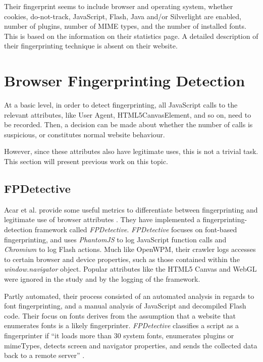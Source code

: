 \documentclass[
    fontsize=12pt,
    headings=small,
    parskip=half,
    bibliography=totoc,
    numbers=noenddot,
    open=any
    ]{scrreprt}
\begin{document}
Their fingerprint seems to include browser and operating system, whether cookies, do-not-track,
JavaScript, Flash, Java and/or Silverlight are enabled, number of plugins, number of MIME types,
and the number of installed fonts. This is based on the information on their statistics page.
A detailed description of their fingerprinting technique is absent on their website.

\section{Browser Fingerprinting Detection}
At a basic level, in order to detect fingerprinting, all JavaScript calls to the relevant attributes,
like User Agent, HTML5CanvasElement, and so on, need to be recorded. Then, a decision can be made about whether the number
of calls is suspicious, or constitutes normal website behaviour.

However, since these attributes also have legitimate uses, this is not a trivial task.
This section will present previous work on this topic.


\subsection{FPDetective}
\label{related_work:fpdetective}
Acar et al. provide some useful metrics to differentiate between fingerprinting and legitimate use of
browser attributes \cite{DBLP:conf/ccs/AcarJNDGPP13}. They have implemented a fingerprinting-detection
framework called \textit{FPDetective}.
\textit{FPDetective} focuses on font-based fingerprinting, and uses
\textit{PhantomJS} to log JavaScript function calls and \textit{Chromium} to log Flash actions.
Much like OpenWPM, their crawler logs accesses to certain browser and device properties, such as
those contained within the \textit{window.navigator} object.
Popular attributes like the HTML5 Canvas and WebGL were ignored in the study and by the logging of the framework.

Partly automated, their process consisted of an automated analysis in regards to font fingerprinting,
and a manual analysis of JavaScript and decompiled Flash code.
Their focus on fonts derives from the assumption that a website that
enumerates fonts is a likely fingerprinter.
\textit{FPDetective} classifies a script as a fingerprinter if ``it loads more than 30 system fonts, enumerates plugins
or mimeTypes, detects screen and navigator properties, and sends the collected data back to a remote server''
\cite{DBLP:conf/ccs/AcarJNDGPP13}.
\end{document}
